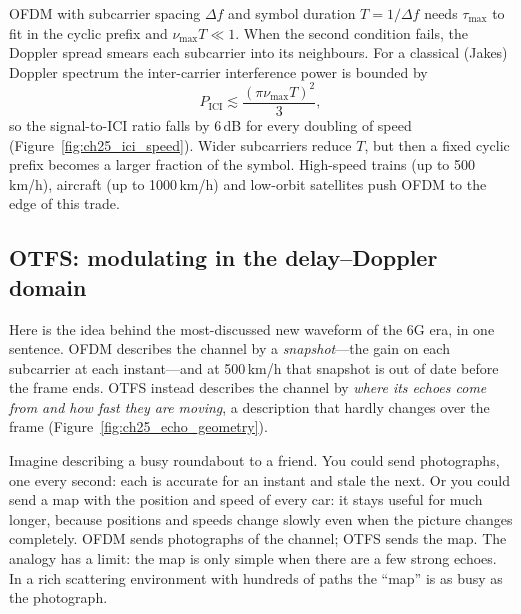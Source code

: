 OFDM with subcarrier spacing $\Delta f$ and symbol duration $T=1/\Delta f$ needs $\tau_{\max}$ to fit in
the cyclic prefix and $\nu_{\max}T\ll1$. When the second condition fails, the Doppler spread smears each
subcarrier into its neighbours. For a classical (Jakes) Doppler spectrum the inter-carrier interference
power is bounded by
\begin{equation}
P_{\text{ICI}}\lesssim\frac{(\pi\nu_{\max}T)^2}{3},
\label{eq:ch25:ici}
\end{equation}
so the signal-to-ICI ratio falls by 6\,dB for every doubling of speed (Figure~\ref{fig:ch25_ici_speed}).
Wider subcarriers reduce $T$, but then a fixed cyclic prefix becomes a larger fraction of the symbol.
High-speed trains (up to 500\,km/h), aircraft (up to 1000\,km/h) and low-orbit satellites push OFDM
to the edge of this trade.


\subsection{OTFS: modulating in the delay--Doppler domain}

Here is the idea behind the most-discussed new waveform of the 6G era, in one sentence. OFDM
describes the channel by a \emph{snapshot}---the gain on each subcarrier at each instant---and at
500\,km/h that snapshot is out of date before the frame ends. OTFS instead describes the channel by
\emph{where its echoes come from and how fast they are moving}, a description that hardly changes
over the frame (Figure~\ref{fig:ch25_echo_geometry}).

\begin{analogy}
Imagine describing a busy roundabout to a friend. You could send photographs, one every second:
each is accurate for an instant and stale the next. Or you could send a map with the position and
speed of every car: it stays useful for much longer, because positions and speeds change slowly even
when the picture changes completely. OFDM sends photographs of the channel; OTFS sends the map. The
analogy has a limit: the map is only simple when there are a few strong echoes. In a rich scattering
environment with hundreds of paths the ``map'' is as busy as the photograph.
\end{analogy}

